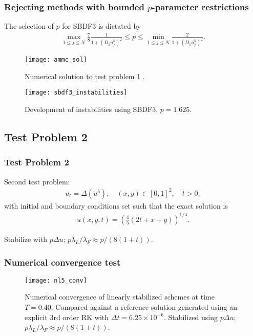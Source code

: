\documentclass[hyperref={pdfpagelabels=false}]{beamer}
\begin{document}
\begin{frame}
	\frametitle{Rejecting methods with bounded $p$-parameter restrictions} 
The selection of $p$ for SBDF3 is dictated by 
	\begin{align*}
		\max_{1\leq j\leq N} \frac{7}{8} \frac{1}{1 + (D_1 \bar u^n_j)^2} 
		\leq p
		\leq \min_{1\leq j\leq N} \frac{2}{1 + (D_1 \bar u^n_j)^2}.
	\end{align*}
	\begin{figure}
		\centering 
\begin{minipage}{0.45\textwidth} 
	\centering
        \texttt{[image: ammc\_sol]}
	\caption{Numerical solution to test problem 1 .}
\end{minipage}
\begin{minipage}{0.45\textwidth} 
	\centering
	\texttt{[image: sbdf3\_instabilities]}
	\caption{Development of instabilities using SBDF3, $p=1.625$.}
\end{minipage} 
	\end{figure}
\end{frame}

\subsection{Test Problem 2}
\begin{frame}
	\frametitle{Test Problem 2} 
Second test problem: 
	\begin{align*}
		u_t = \Delta(u^5), 
		\quad (x,y) \in [0,1]^2, \quad t > 0, 
	\end{align*}
with initial and boundary conditions set such that the exact solution is 
	\begin{align*}
		u(x,y,t) = \left(\frac{4}{5}(2t+x+y) \right)^{1/4}.
	\end{align*}
	
Stabilize with $p\Delta u$; $p\lambda_L/\lambda_F \approx p/(8(1+t))$.
\end{frame}

\begin{frame}
	\frametitle{Numerical convergence test}
	\begin{figure}[t]
		\centering
		\texttt{[image: nl5\_conv]}
		\caption{Numerical convergence of linearly stabilized schemes at time $T=0.40$. Compared against a reference solution generated using an explicit 3rd order RK with $\Delta t = 6.25\times 10^{-6}$. Stabilized using $p\Delta u$; $p\lambda_L / \lambda_F \approx p/(8(1+t))$.}
	\end{figure} 
\end{frame}
\end{document}
